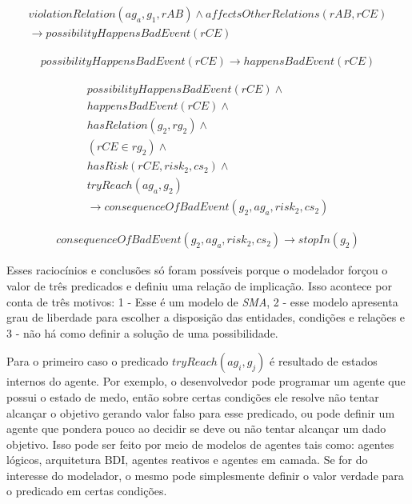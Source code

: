 \begin{eqnarray}
    violationRelation(ag_a,g_1,rAB)  \wedge affectsOtherRelations(rAB,rCE) \nonumber \\
    \to possibilityHappensBadEvent(rCE)  
\end{eqnarray}

\begin{eqnarray}
    possibilityHappensBadEvent(rCE) \to happensBadEvent(rCE) 
\end{eqnarray}

\begin{eqnarray}\label{paybutiamnotguilty}
    possibilityHappensBadEvent(rCE) \wedge  \nonumber \\
    happensBadEvent(rCE) \wedge  \nonumber \\
    hasRelation(g_2,rg_2) \wedge  \nonumber \\
    (rCE \in rg_2) \nonumber \wedge  \nonumber \\
    hasRisk(rCE,risk_2,cs_2) \wedge  \nonumber \\
    tryReach(ag_a,g_2) \nonumber  \nonumber \\
    \to consequenceOfBadEvent(g_2,ag_a,risk_2,cs_2) 
\end{eqnarray}


\begin{eqnarray}\label{badcons}
    consequenceOfBadEvent(g_2,ag_a,risk_2,cs_2) \to stopIn(g_2) 
\end{eqnarray}


Esses raciocínios e conclusões só foram possíveis porque o modelador forçou o valor de três predicados e definiu uma relação de implicação. Isso acontece por conta de três motivos: 1 - Esse é um modelo de \textit{SMA}, 2 - esse modelo apresenta grau de liberdade para escolher a disposição das entidades, condições e relações e 3 - não há como definir a solução de uma possibilidade. 

Para o primeiro caso o predicado $tryReach(ag_i,g_j)$ é resultado de estados internos do agente. Por exemplo, o desenvolvedor pode programar um agente que possui o estado de medo, então sobre certas condições ele resolve não tentar alcançar o objetivo gerando valor falso para esse predicado, ou pode definir um agente que pondera pouco ao decidir se deve ou não tentar alcançar um dado objetivo. Isso pode ser feito por meio de modelos de agentes tais como: agentes lógicos, arquitetura BDI, agentes reativos e agentes em camada. Se for do interesse do modelador, o mesmo pode simplesmente definir o valor verdade para o predicado em certas condições. 

